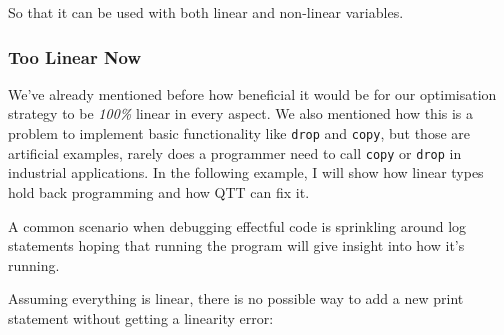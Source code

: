 \documentclass[
]{article}
\newenvironment{Shaded}{}{}
\newcommand{\DataTypeTok}[1]{\textcolor[rgb]{0.56,0.13,0.00}{#1}}
\newcommand{\DecValTok}[1]{\textcolor[rgb]{0.25,0.63,0.44}{#1}}
\newcommand{\FunctionTok}[1]{\textcolor[rgb]{0.02,0.16,0.49}{#1}}
\newcommand{\KeywordTok}[1]{\textcolor[rgb]{0.00,0.44,0.13}{\textbf{#1}}}
\newcommand{\NormalTok}[1]{#1}
\newcommand{\OperatorTok}[1]{\textcolor[rgb]{0.40,0.40,0.40}{#1}}
\newcommand{\OtherTok}[1]{\textcolor[rgb]{0.00,0.44,0.13}{#1}}
\newcommand{\StringTok}[1]{\textcolor[rgb]{0.25,0.44,0.63}{#1}}
\begin{document}
So that it can be used with both linear and non-linear variables.

\hypertarget{too-linear-now}{%
\subsubsection{Too Linear Now}\label{too-linear-now}}

We've already mentioned before how beneficial it would be for our
optimisation strategy to be \emph{100\%} linear in every aspect. We also
mentioned how this is a problem to implement basic functionality like
\texttt{drop} and \texttt{copy}, but those are artificial examples,
rarely does a programmer need to call \texttt{copy} or \texttt{drop} in
industrial applications. In the following example, I will show how
linear types hold back programming and how QTT can fix it.

A common scenario when debugging effectful code is sprinkling around log
statements hoping that running the program will give insight into how
it's running.

\begin{Shaded}
\end{Shaded}

Assuming everything is linear, there is no possible way to add a new
print statement without getting a linearity error:
\end{document}
